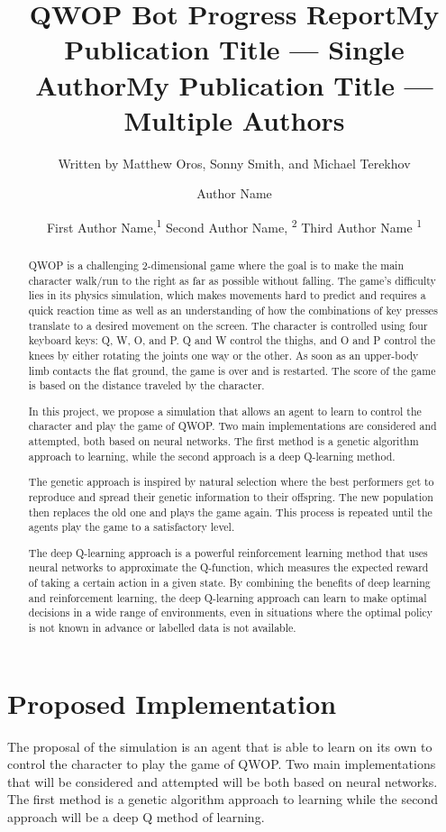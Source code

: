 \documentclass[letterpaper]{article} %
\title{QWOP Bot Progress Report}
\author{
    Written by Matthew Oros, Sonny Smith, and Michael Terekhov \\ 
}
\title{My Publication Title --- Single Author}
\author {
    Author Name \\
}
\title{My Publication Title --- Multiple Authors}
\author {
    First Author Name,\textsuperscript{\rm 1}
    Second Author Name, \textsuperscript{\rm 2}
    Third Author Name \textsuperscript{\rm 1} \\
}
\begin{document}
\maketitle

\begin{abstract}
QWOP is a challenging 2-dimensional game where the goal is to make the main character walk/run to the right as far as possible without falling. The game's difficulty lies in its physics simulation, which makes movements hard to predict and requires a quick reaction time as well as an understanding of how the combinations of key presses translate to a desired movement on the screen. The character is controlled using four keyboard keys: Q, W, O, and P. Q and W control the thighs, and O and P control the knees by either rotating the joints one way or the other. As soon as an upper-body limb contacts the flat ground, the game is over and is restarted. The score of the game is based on the distance traveled by the character.

\par In this project, we propose a simulation that allows an agent to learn to control the character and play the game of QWOP. Two main implementations are considered and attempted, both based on neural networks. The first method is a genetic algorithm approach to learning, while the second approach is a deep Q-learning method.

\par The genetic approach is inspired by natural selection where the best performers get to reproduce and spread their genetic information to their offspring. The new population then replaces the old one and plays the game again. This process is repeated until the agents play the game to a satisfactory level.

\par The deep Q-learning approach is a powerful reinforcement learning method that uses neural networks to approximate the Q-function, which measures the expected reward of taking a certain action in a given state. By combining the benefits of deep learning and reinforcement learning, the deep Q-learning approach can learn to make optimal decisions in a wide range of environments, even in situations where the optimal policy is not known in advance or labelled data is not available.

\end{abstract}

\section{Proposed Implementation}
The proposal of the simulation is an agent that is able to learn on its own to control the character to play the game of QWOP. Two main implementations that will be considered and attempted will be both based on neural networks. The first method is a genetic algorithm approach to learning while the second approach will be a deep Q method of learning.
\end{document}
